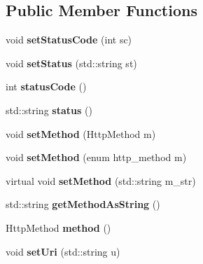 \subsection*{Public Member Functions}
\begin{DoxyCompactItemize}
\item 
\mbox{\label{class_message_base_ab750b4a7967fcd3e129d28a3ae1d4e86}} 
void {\bfseries set\+Status\+Code} (int sc)
\item 
\mbox{\label{class_message_base_a1340e12d07b6a0bbaff5221c3683c242}} 
void {\bfseries set\+Status} (std\+::string st)
\item 
\mbox{\label{class_message_base_a030bbf498c20f1c2a2ce281ac69a1e61}} 
int {\bfseries status\+Code} ()
\item 
\mbox{\label{class_message_base_a730462343be26eae0b3b56941c837c61}} 
std\+::string {\bfseries status} ()
\item 
\mbox{\label{class_message_base_ac12869ed519facbe12e9fa9ee71e5d9b}} 
void {\bfseries set\+Method} (Http\+Method m)
\item 
\mbox{\label{class_message_base_a917ec916c37524ff7a8c9b27c3d0bb98}} 
void {\bfseries set\+Method} (enum http\+\_\+method m)
\item 
\mbox{\label{class_message_base_acfc91d36bdd4dd1b3828a03f5d427b54}} 
virtual void {\bfseries set\+Method} (std\+::string m\+\_\+str)
\item 
\mbox{\label{class_message_base_a124e822086bf08600f83aa834ede9fce}} 
std\+::string {\bfseries get\+Method\+As\+String} ()
\item 
\mbox{\label{class_message_base_a21720424f7a3a95b0ee150cedf047789}} 
Http\+Method {\bfseries method} ()
\item 
\mbox{\label{class_message_base_a23d29f983dd8ea011e21a974bdaa90b4}} 
void {\bfseries set\+Uri} (std\+::string u)
\item 
\mbox{\label{class_message_base_a71811fa2215104e4aaf504f0e51c377e}} 

\end{DoxyCompactItemize}
